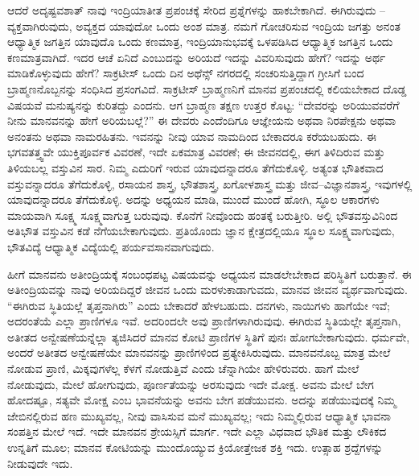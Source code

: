 ಆದರೆ ಅದೃಷ್ಟವಶಾತ್ ನಾವು ಇಂದ್ರಿಯಾತೀತ ಪ್ರಪಂಚಕ್ಕೆ ಸೇರಿದ ಪ್ರಶ್ನೆಗಳನ್ನು ಹಾಕಬೇಕಾಗಿದೆ. ಈಗಿರುವುದು – ವ್ಯಕ್ತವಾಗಿರುವುದು, ಅವ್ಯಕ್ತದ ಯಾವುದೋ ಒಂದು ಅಂಶ ಮಾತ್ರ. ನಮಗೆ ಗೋಚರಿಸುವ ಇಂದ್ರಿಯ ಜಗತ್ತು ಅನಂತ ಆಧ್ಯಾತ್ಮಿಕ ಜಗತ್ತಿನ ಯಾವುದೊ ಒಂದು ಕಣಮಾತ್ರ, ಇಂದ್ರಿಯಾನುಭವಕ್ಕೆ ಒಳಪಡಿಸಿದ ಆಧ್ಯಾತ್ಮಿಕ ಜಗತ್ತಿನ ಒಂದು ಕಣಮಾತ್ರವಾಗಿದೆ. ಇದರ ಆಚೆ ಏನಿದೆ ಎಂಬುದನ್ನು ಅರಿಯದೆ ಇದನ್ನು ವಿವರಿಸುವುದು ಹೇಗೆ? ಇದನ್ನು ಅರ್ಥ ಮಾಡಿಕೊಳ್ಳುವುದು ಹೇಗೆ? ಸಾಕ್ರಟೀಸ್ ಒಂದು ದಿನ ಅಥೆನ್ಸ್ ನಗರದಲ್ಲಿ ಸಂಚರಿಸುತ್ತಿದ್ದಾಗ ಗ್ರೀಸಿಗೆ ಬಂದ ಬ್ರಾಹ್ಮಣನೊಬ್ಬನನ್ನು ಸಂಧಿಸಿದ ಪ್ರಸಂಗವಿದೆ. ಸಾಕ್ರಟೀಸ್ ಬ್ರಾಹ್ಮಣನಿಗೆ ಮಾನವ ಪ್ರಪಂಚದಲ್ಲಿ ಕಲಿಯಬೇಕಾದ ದೊಡ್ಡ ವಿಷಯವೆ ಮನುಷ್ಯನನ್ನು ಕುರಿತದ್ದು ಎಂದನು. ಆಗ ಬ್ರಾಹ್ಮಣ ತಕ್ಷಣ ಉತ್ತರ ಕೊಟ್ಟ: “ದೇವರನ್ನು ಅರಿಯುವವರೆಗೆ ನೀನು ಮಾನವನನ್ನು ಹೇಗೆ ಅರಿಯಬಲ್ಲೆ?” ಈ ದೇವರು ಎಂದೆಂದಿಗೂ ಆಜ್ಞೇಯನು ಅಥವಾ ನಿರಪೇಕ್ಷನು ಅಥವಾ ಅನಂತನು ಅಥವಾ ನಾಮರಹಿತನು. ಇವನನ್ನು ನೀವು ಯಾವ ನಾಮದಿಂದ ಬೇಕಾದರೂ ಕರೆಯಬಹುದು. ಈ ಭಗವತತ್ತ್ವವೇ ಯುಕ್ತಿಪೂರ್ವಕ ವಿವರಣೆ, ಇದೇ ಏಕಮಾತ್ರ ವಿವರಣೆ; ಈ ಜೀವನದಲ್ಲಿ, ಈಗ ತಿಳಿದಿರುವ ಮತ್ತು ತಿಳಿಯಬಲ್ಲ ವಸ್ತುವಿನ ಸಾರ. ನಿಮ್ಮ ಎದುರಿಗೆ ಇರುವ ಯಾವುದನ್ನಾದರೂ ತೆಗೆದುಕೊಳ್ಳಿ. ಅತ್ಯಂತ ಭೌತಿಕವಾದ ವಸ್ತುವನ್ನಾದರೂ ತೆಗೆದುಕೊಳ್ಳಿ, ರಸಾಯನ ಶಾಸ್ತ್ರ, ಭೌತಶಾಸ್ತ್ರ, ಖಗೋಳಶಾಸ್ತ್ರ ಮತ್ತು ಜೀವ–ವಿಜ್ಞಾನಶಾಸ್ತ್ರ, ಇವುಗಳಲ್ಲಿ ಯಾವುದನ್ನಾದರೂ ತೆಗೆದುಕೊಳ್ಳಿ. ಅದನ್ನು ಅಧ್ಯಯನ ಮಾಡಿ, ಮುಂದೆ ಮುಂದೆ ಹೋಗಿ, ಸ್ಥೂಲ ಆಕಾರಗಳು ಮಾಯವಾಗಿ ಸೂಕ್ಷ್ಮ ಸೂಕ್ಷ್ಮವಾಗುತ್ತ ಬರುವುವು. ಕೊನೆಗೆ ನೀವೊಂದು ಹಂತಕ್ಕೆ ಬರುತ್ತೀರಿ. ಅಲ್ಲಿ ಭೌತವಸ್ತುವಿನಿಂದ ಅತಿಭೌತ ವಸ್ತುವಿನ ಕಡೆ ನೆಗೆಯಬೇಕಾಗುವುದು. ಪ್ರತಿಯೊಂದು ಜ್ಞಾನ ಕ್ಷೇತ್ರದಲ್ಲಿಯೂ ಸ್ಥೂಲ ಸೂಕ್ಷ್ಮವಾಗುವುದು, ಭೌತವಿದ್ಯೆ ಆಧ್ಯಾತ್ಮಿಕ ವಿದ್ಯೆಯಲ್ಲಿ ಪರ್ಯವಸಾನವಾಗುವುದು.

ಹೀಗೆ ಮಾನವನು ಅತೀಂದ್ರಿಯಕ್ಕೆ ಸಂಬಂಧಪಟ್ಟ ವಿಷಯವನ್ನು ಅಧ್ಯಯನ ಮಾಡಲೇಬೇಕಾದ ಪರಿಸ್ಥಿತಿಗೆ ಬರುತ್ತಾನೆ. ಈ ಅತೀಂದ್ರಿಯವನ್ನು ನಾವು ಅರಿಯದಿದ್ದರೆ ಜೀವನ ಒಂದು ಮರಳುಕಾಡಾಗುವದು, ಮಾನವ ಜೀವನ ವ್ಯರ್ಥವಾಗುವುದು. “ಈಗಿರುವ ಸ್ಥಿತಿಯಲ್ಲೆ ತೃಪ್ತನಾಗಿರು'' ಎಂದು ಬೇಕಾದರೆ ಹೇಳಬಹುದು. ದನಗಳು, ನಾಯಿಗಳು ಹಾಗೆಯೇ ಇವೆ; ಅದರಂತೆಯೆ ಎಲ್ಲಾ ಪ್ರಾಣಿಗಳೂ ಇವೆ. ಅದರಿಂದಲೇ ಅವು ಪ್ರಾಣಿಗಳಾಗಿರುವುವು. ಈಗಿರುವ ಸ್ಥಿತಿಯಲ್ಲೇ ತೃಪ್ತನಾಗಿ, ಅತೀತದ ಅನ್ವೇಷಣೆಯನ್ನೆಲ್ಲಾ ತ್ಯಜಿಸಿದರೆ ಮಾನವ ಕೋಟಿ ಪ್ರಾಣಿಗಳ ಸ್ಥಿತಿಗೆ ಪುನಃ ಹೋಗಬೇಕಾಗುವುದು. ಧರ್ಮವೇ, ಅಂದರೆ ಅತೀತದ ಅನ್ವೇಷಣೆಯೇ ಮಾನವನನ್ನು ಪ್ರಾಣಿಗಳಿಂದ ಪ್ರತ್ಯೇಕಿಸಿರುವುದು. ಮಾನವನೊಬ್ಬ ಮಾತ್ರ ಮೇಲೆ ನೋಡುವ ಪ್ರಾಣಿ, ಮಿಕ್ಕವುಗಳೆಲ್ಲ ಕೆಳಗೆ ನೋಡುತ್ತಿವೆ ಎಂದು ಚೆನ್ನಾಗಿಯೇ ಹೇಳಿರುವರು. ಹಾಗೆ ಮೇಲೆ ನೋಡುವುದು, ಮೇಲೆ ಹೋಗುವುದು, ಪೂರ್ಣತೆಯನ್ನು ಅರಸುವುದು ಇದೇ ಮೋಕ್ಷ. ಅವನು ಮೇಲೆ ಬೇಗ ಹೋದಷ್ಟೂ, ಸತ್ಯವೇ ಮೋಕ್ಷ ಎಂಬ ಭಾವನೆಯನ್ನು ಅವನು ಬೇಗ ಪಡೆಯುವನು. ಅದನ್ನು ಪಡೆಯುವುದಕ್ಕೆ ನಿಮ್ಮ ಜೇಬಿನಲ್ಲಿರುವ ಹಣ ಮುಖ್ಯವಲ್ಲ, ನೀವು ವಾಸಿಸುವ ಮನೆ ಮುಖ್ಯವಲ್ಲ; ಇದು ನಿಮ್ಮಲ್ಲಿರುವ ಆಧ್ಯಾತ್ಮಿಕ ಭಾವನಾ ಸಂಪತ್ತಿನ ಮೇಲೆ ಇದೆ. ಇದೇ ಮಾನವನ ಶ್ರೇಯಸ್ಸಿಗೆ ಮಾರ್ಗ. ಇದೇ ಎಲ್ಲಾ ವಿಧವಾದ ಭೌತಿಕ ಮತ್ತು ಲೌಕಿಕದ ಉನ್ನತಿಗೆ ಮೂಲ; ಮಾನವ ಕೋಟಿಯನ್ನು ಮುಂದೊಯ್ಯುವ ಕ್ರಿಯೋತ್ತೇಜಕ ಶಕ್ತಿ ಇದು. ಉತ್ಸಾಹ ಶ್ರದ್ದೆಗಳನ್ನು ನೀಡುವುದೇ ಇದು.

